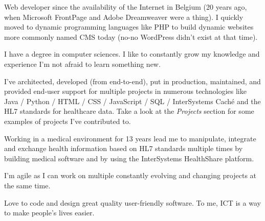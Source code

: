 

\begin{cvparagraph}

Web developer since the availability of the Internet in Belgium (20 years ago, when Microsoft FrontPage and Adobe Dreamweaver were a thing). I quickly moved to dynamic programming languages like PHP to build dynamic websites more commonly named CMS today (no-no WordPress didn't exist at that time).

I have a degree in computer sciences. I like to constantly grow my knowledge and experience \Rightarrow  I'm not afraid to learn something new. 

I've architected, developed (from end-to-end), put in production, maintained, and provided end-user support for multiple projects in numerous technologies like Java / Python / HTML / CSS / JavaScript / SQL / InterSystems Caché and the HL7 standards for healthcare data. Take a look at the \emph{Projects} section for some examples of projects I've contributed to.

Working in a medical environment for 13 years lead me to manipulate, integrate and exchange health information based on HL7 standards multiple times by building medical software and by using the InterSystems HealthShare platform.

I'm agile as I can work on multiple constantly evolving and changing projects at the same time.

Love to code and design great quality user-friendly software.
To me, ICT is a way to make people's lives easier.
\end{cvparagraph}
